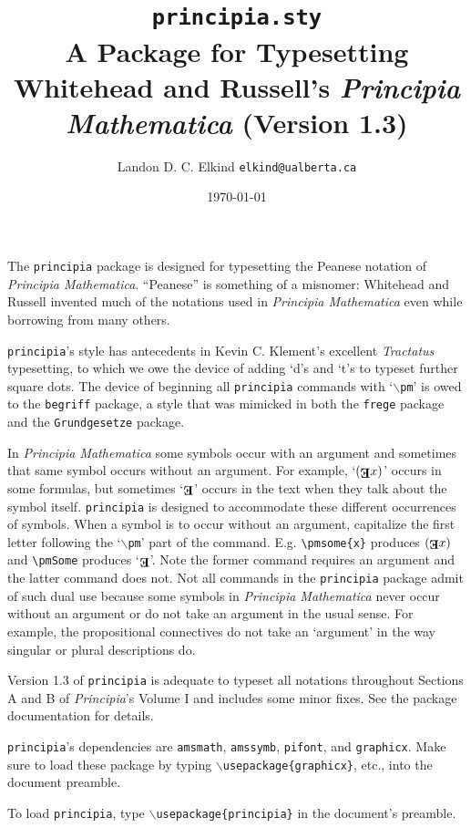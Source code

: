 \documentclass[12pt]{article}
\title{\texttt{principia.sty}\\ A \LaTeXe \space Package for Typesetting Whitehead and Russell's \textit{Principia Mathematica} (Version 1.3)}
\author{Landon D. C. Elkind \texttt{elkind@ualberta.ca}}
\date{\today}
\newcommand{\pmsome}[1]{(\text{\raisebox{.5em}{\rotatebox{180}{\textbf{E}}}}#1)} %
\newcommand{\pmSome}{\text{\raisebox{.5em}{\rotatebox{180}{\textbf{E}}}}}
\begin{document}
\maketitle
\onehalfspacing
The \texttt{principia} package is designed for typesetting the Peanese notation of \textit{Principia Mathematica}. ``Peanese'' is something of a misnomer: Whitehead and Russell invented much of the notations used in \textit{Principia Mathematica} even while borrowing from many others.

\texttt{principia}'s style has antecedents in Kevin C. Klement's excellent \textit{Tractatus} typesetting, to which we owe the device of adding `d's and `t's to typeset further square dots. The device of beginning all \texttt{principia} commands with `\texttt{$\backslash$pm}' is owed to the \texttt{begriff} package, a style that was mimicked in both the \texttt{frege} package and the \texttt{Grundgesetze} package. 

In \textit{Principia Mathematica} some symbols occur with an argument and sometimes that same symbol occurs without an argument. For example, `$\pmsome{x}$' occurs in some formulas, but sometimes `$\pmSome$' occurs in the text when they talk about the symbol itself. \texttt{principia} is designed to accommodate these different occurrences of symbols. When a symbol is to occur without an argument, capitalize the first letter following the `\texttt{$\backslash$pm}' part of the command. E.g. \verb|\pmsome{x}| produces $\pmsome{x}$ and \verb|\pmSome| produces `$\pmSome$'. Note the former command requires an argument and the latter command does not. Not all commands in the \texttt{principia} package admit of such dual use because some symbols in \textit{Principia Mathematica} never occur without an argument or do not take an argument in the usual sense. For example, the propositional connectives do not take an `argument' in the way singular or plural descriptions do.

Version 1.3 of \texttt{principia} is adequate to typeset all notations throughout Sections A and B of \textit{Principia}'s Volume I and includes some minor fixes. See the package documentation for details. 

\texttt{principia}'s dependencies are \texttt{amsmath}, \texttt{amssymb}, \texttt{pifont}, and \texttt{graphicx}. Make sure to load these package by typing \texttt{$\backslash$usepackage\{graphicx\}}, etc., into the document preamble. 

To load \texttt{principia}, type \texttt{$\backslash$usepackage\{principia\}} in the document's preamble.
\end{document}
